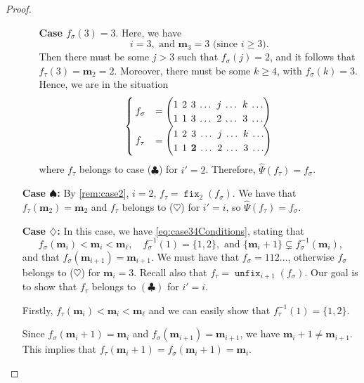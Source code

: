 \documentclass[reqno]{amsart}
\theoremstyle{definition}
\newcommand{\fretherD}{\hat{\Psi}}
\newcommand{\caseOne}{\ensuremath{\heartsuit}}
\newcommand{\caseTwo}{\ensuremath{\spadesuit}}
\newcommand{\caseThree}{\ensuremath{\diamondsuit}}
\newcommand{\caseFour}{\ensuremath{\clubsuit}}
\newcommand{\img}{\mathbf{m}}
\DeclareMathOperator{\fixMap}{\mathtt{fix}}
\DeclareMathOperator{\unfixMap}{\mathtt{unfix}}
\begin{document}
\begin{proof}
\begin{enumerate}[leftmargin=1.6cm]
\begin{itemize}[leftmargin=-1cm]
			\medskip 
			\noindent 
			\textbf{Case $f_\sigma(3)=3$}. 
			Here, we have
			\[
				i=3, \text{ and } \img_3=3 \text{ (since $i\geq 3$)}.
			\]
			Then there must be some $j>3$ such that $f_\sigma(j)=2$,
			and it follows that $f_\tau(3)=\img_2=2$. 
			Moreover, there must be some $k \geq 4$, with $f_\sigma(k)=3$. 
			Hence, we are in the situation
			\begin{equation}\label{eq:case1SomeSubcase3}
			\setlength\arraycolsep{2pt}
			\begin{cases}
				f_\sigma &= 
				\begin{pmatrix}
				1 & 2 & 3 &  \dotsc & j & \dotsc  & k & \dotsc\\
				1 & 1 & 3 &  \dotsc & 2 & \dotsc  & 3 & \dotsc
				\end{pmatrix} \\
				f_\tau &= 
				\begin{pmatrix}
				1 & 2 & 3 &  \dotsc & j & \dotsc  & k & \dotsc\\
				1 & 1 & \mathbf{2} &  \dotsc & 2 & \dotsc  & 3 & \dotsc
				\end{pmatrix}
			\end{cases}
			\end{equation}
			where $f_\tau$ belongs to case (\caseFour) for $i'=2$.
			Therefore, $\fretherD(f_\tau)=f_\sigma$.
		\end{itemize}
		
		\item[\textbf{Case \caseTwo:}] 
		By \cref{rem:case2}, $i=2$, $f_\tau = \fixMap_2(f_\sigma)$.
		We have that $f_\tau(\img_2)=\img_2$ and $f_\tau$ belongs to (\caseOne) for $i'=i$,
		so $\fretherD(f_\tau)=f_\sigma$.
		
		
		
	\item[\textbf{Case \caseThree:}] In this case,
	  we have \eqref{eq:case34Conditions}, stating that 
		\[
		f_{\sigma}(\img_i) < \img_i < \img_\ell,\quad
		f^{-1}_\sigma(1) = \{1,2\}, \text{ and }
		\{\img_i + 1\}\subsetneq f^{-1}_\sigma(\img_i),
		\]
	  and that $f_\sigma(\img_{i+1})=\img_{i+1}$.
		We must have that $f_\sigma = 112 \dotsc$, otherwise $f_\sigma$ belongs to
		(\caseOne) for $\img_i=3$. Recall also that $f_\tau = \unfixMap_{i+1}(f_\sigma)$.
		Our goal is to show that $f_\tau$ belongs to $(\caseFour)$ for $i'=i$.
		
		Firstly, $f_\tau(\img_i)<\img_i<\img_\ell$
		and we can easily show that $f_\tau^{-1}(1)=\{1,2\}$.
		
		Since 
		$f_\sigma(\img_i+1)=\img_i$ and  
		$f_\sigma(\img_{i+1})=\img_{i+1}$, we have $\img_i+1\neq \img_{i+1}$. 
		This implies that $f_\tau(\img_i+1)=f_\sigma(\img_i+1)=\img_i$.
		

\end{enumerate}
\end{proof}
\end{document}
